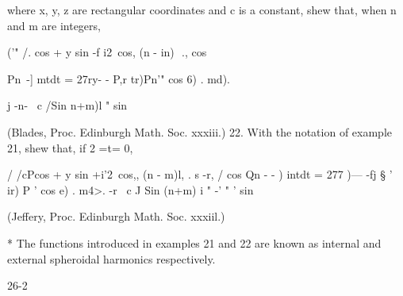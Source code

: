 where x, y, z are rectangular coordinates and c is a constant, shew
that, when n and m are integers,

('" /. cos + y sin -f i2\ cos, (n - in)\ \,., cos

Pn\ -] mtdt = 27ry- - P,r tr)Pn'" cos 6) . md).

j -n- \ c /Sin n+m)l " sin

(Blades, Proc. Edinburgh Math. Soc. xxxiii.) 22. With the notation of
example 21, shew that, if 2 =t= 0,

/ /cPcos + y sin +i'2\ cos,, (n - m)l, . s -r, / cos Qn - - ) intdt
= 277 )--- -fj § ' ir) P ' cos e) . m4>. -r \ c J Sin (n+m) i " -' " '
sin

(Jeffery, Proc. Edinburgh Math. Soc. xxxiil.)

* The functions introduced in examples 21 and 22 are known as internal
and external spheroidal harmonics respectively.

26-2

